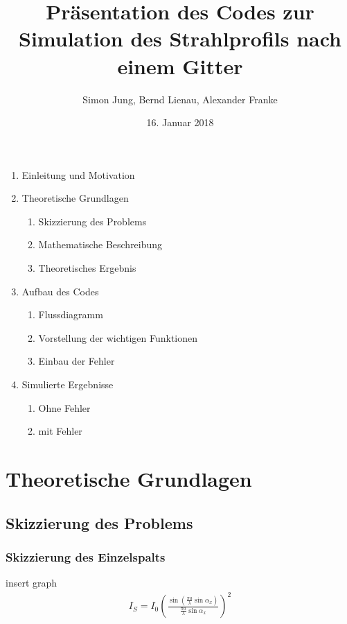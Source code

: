 \documentclass{beamer}
\title{Präsentation des Codes zur Simulation des Strahlprofils nach einem Gitter}
\author{Simon Jung, Bernd Lienau, Alexander Franke}
\date{16. Januar 2018}
\begin{document}
\begin{frame}
\maketitle
\end{frame}


\begin{frame}
\begin{enumerate}
\item	Einleitung und Motivation
\item	Theoretische Grundlagen
	\begin{enumerate}
	\item	Skizzierung des Problems
	\item	Mathematische Beschreibung
	\item	Theoretisches Ergebnis
	\end{enumerate}
\item	Aufbau des Codes
	\begin{enumerate}
	\item	Flussdiagramm
	\item	Vorstellung der wichtigen Funktionen
	\item	Einbau der Fehler
	\end{enumerate}
\item	Simulierte Ergebnisse
	\begin{enumerate}
	\item	Ohne Fehler
	\item	mit Fehler
	\end{enumerate}
\end{enumerate}

\end{frame}



\section{Theoretische Grundlagen}
\subsection{Skizzierung des Problems}
\begin{frame}
  \frametitle{Skizzierung des Einzelspalts}

insert graph\\

\begin{align*}
I_S = I_0 \left( \frac{\sin\left(\frac{\pi a}{\lambda}\sin \alpha_x\right)}{\frac{\pi a}{\lambda} \sin \alpha_x} \right)^2
\label{eq:einzelspalt_vorueberlegung}
\end{align*}





\end{frame}
\end{document}
